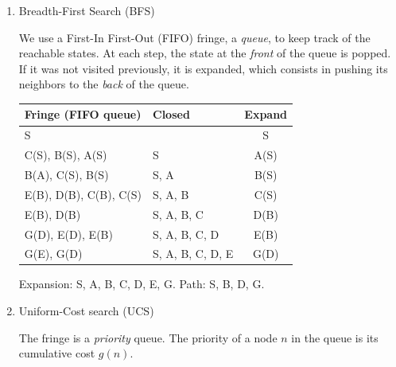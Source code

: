 \documentclass[11pt, a4paper]{article}
\begin{document}
\begin{enumerate}
    \item Breadth-First Search (BFS)
    
    \begin{solution}
        We use a First-In First-Out (FIFO) fringe, \ie{} a \emph{queue}, to keep track of the reachable states. At each step, the state at the \emph{front} of the queue is popped. If it was not visited previously, it is expanded, which consists in pushing its neighbors to the \emph{back} of the queue.
    
        \begin{table}[h]
            \centering
            \begin{tabular}{l|l|c}
                \toprule
                Fringe (FIFO queue) & Closed & Expand \\
                \midrule
                S & & S \\
                C(S), B(S), A(S) & S & A(S) \\
                B(A), C(S), B(S) & S, A & B(S) \\
                E(B), D(B), C(B), C(S) & S, A, B & C(S) \\
                E(B), D(B) & S, A, B, C & D(B) \\
                G(D), E(D), E(B) & S, A, B, C, D & E(B) \\
                G(E), G(D) & S, A, B, C, D, E & G(D) \\
                \bottomrule
            \end{tabular}
        \end{table}
        
        Expansion: S, A, B, C, D, E, G. Path: S, B, D, G.
    \end{solution}
    
    \item Uniform-Cost search (UCS)
    
    \begin{solution}
        The fringe is a \emph{priority} queue. The priority of a node $n$ in the queue is its cumulative cost $g(n)$.
    

\end{solution}
\end{enumerate}
\end{document}
